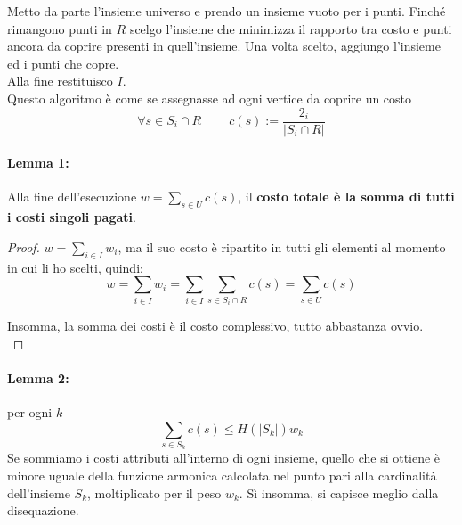 \documentclass[11pt]{article}
\begin{document}
	Metto da parte l'insieme universo e prendo un insieme vuoto per i punti. Finché rimangono punti in $R$ scelgo l'insieme che minimizza il rapporto tra costo e punti ancora da coprire presenti in quell'insieme. Una volta scelto, aggiungo l'insieme ed i punti che copre.\\
	Alla fine restituisco $I$.\\
	
	Questo algoritmo è come se assegnasse ad ogni vertice da coprire un costo
	$$\forall s \in S_i \cap R \;\;\;\;\;\;\;\; c(s) := \frac{2_i}{|S_i \cap R|}$$
	
	\newpage
	
	\paragraph{Lemma 1:} Alla fine dell'esecuzione $w = \sum_{s \in U} c(s)$, il \textbf{costo totale è la somma di tutti i costi singoli pagati}.\\
	
	\begin{proof}
		$w = \sum_{i \in I} w_i$, ma il suo costo è ripartito in tutti gli elementi al momento in cui li ho scelti, quindi: 
		$$ w = \sum_{i \in I} w_i = \sum_{i \in I} \sum_{s \in S_i \cap R} c(s) = \sum_{s \in U} c(s) $$
		
		Insomma, la somma dei costi è il costo complessivo, tutto abbastanza ovvio.\\
	\end{proof}
	
	\paragraph{Lemma 2:} per ogni $k$ 
	$$ \sum_{s \in S_k} c(s) \leq H(|S_k|) w_k $$
	Se sommiamo i costi attributi all'interno di ogni insieme, quello che si ottiene è minore uguale della funzione armonica calcolata nel punto pari alla cardinalità dell'insieme $S_k$, moltiplicato per il peso $w_k$. Sì insomma, si capisce meglio dalla disequazione.\\
	
\end{document}
